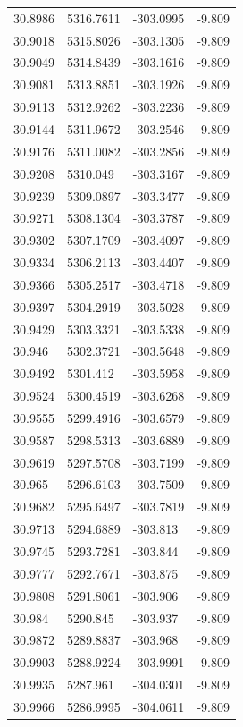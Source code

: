 \begin{table}[H]
\begin{tabular}{llll}
30.8986 & 5316.7611 & -303.0995 & -9.809 \\
30.9018 & 5315.8026 & -303.1305 & -9.809 \\
30.9049 & 5314.8439 & -303.1616 & -9.809 \\
30.9081 & 5313.8851 & -303.1926 & -9.809 \\
30.9113 & 5312.9262 & -303.2236 & -9.809 \\
30.9144 & 5311.9672 & -303.2546 & -9.809 \\
30.9176 & 5311.0082 & -303.2856 & -9.809 \\
30.9208 & 5310.049 & -303.3167 & -9.809 \\
30.9239 & 5309.0897 & -303.3477 & -9.809 \\
30.9271 & 5308.1304 & -303.3787 & -9.809 \\
30.9302 & 5307.1709 & -303.4097 & -9.809 \\
30.9334 & 5306.2113 & -303.4407 & -9.809 \\
30.9366 & 5305.2517 & -303.4718 & -9.809 \\
30.9397 & 5304.2919 & -303.5028 & -9.809 \\
30.9429 & 5303.3321 & -303.5338 & -9.809 \\
30.946 & 5302.3721 & -303.5648 & -9.809 \\
30.9492 & 5301.412 & -303.5958 & -9.809 \\
30.9524 & 5300.4519 & -303.6268 & -9.809 \\
30.9555 & 5299.4916 & -303.6579 & -9.809 \\
30.9587 & 5298.5313 & -303.6889 & -9.809 \\
30.9619 & 5297.5708 & -303.7199 & -9.809 \\
30.965 & 5296.6103 & -303.7509 & -9.809 \\
30.9682 & 5295.6497 & -303.7819 & -9.809 \\
30.9713 & 5294.6889 & -303.813 & -9.809 \\
30.9745 & 5293.7281 & -303.844 & -9.809 \\
30.9777 & 5292.7671 & -303.875 & -9.809 \\
30.9808 & 5291.8061 & -303.906 & -9.809 \\
30.984 & 5290.845 & -303.937 & -9.809 \\
30.9872 & 5289.8837 & -303.968 & -9.809 \\
30.9903 & 5288.9224 & -303.9991 & -9.809 \\
30.9935 & 5287.961 & -304.0301 & -9.809 \\
30.9966 & 5286.9995 & -304.0611 & -9.809 \\

\end{tabular}
\end{table}
